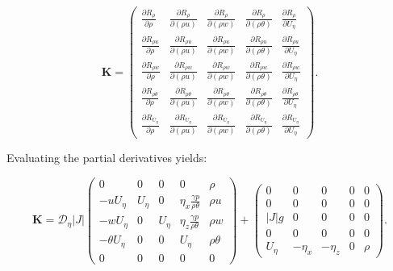 \documentclass[11pt,a4paper]{article}
\begin{document}
		\begin{equation}
			\mathbf{K} = \begin{pmatrix}
				\frac{\partial R_\rho}{\partial \rho} & \frac{\partial R_\rho}{\partial (\rho u)} & \frac{\partial R_\rho}{\partial (\rho w)} & \frac{\partial R_\rho}{\partial (\rho \theta)} & \frac{\partial R_\rho}{\partial U_\eta} \\[10pt]
				\frac{\partial R_{\rho u}}{\partial \rho} & \frac{\partial R_{\rho u}}{\partial (\rho u)} & \frac{\partial R_{\rho u}}{\partial (\rho w)} & \frac{\partial R_{\rho u}}{\partial (\rho \theta)} & \frac{\partial R_{\rho u}}{\partial U_\eta} \\[10pt]
				\frac{\partial R_{\rho w}}{\partial \rho} & \frac{\partial R_{\rho w}}{\partial (\rho u)} & \frac{\partial R_{\rho w}}{\partial (\rho w)} & \frac{\partial R_{\rho w}}{\partial (\rho \theta)} & \frac{\partial R_{\rho w}}{\partial U_\eta} \\[10pt]
				\frac{\partial R_{\rho \theta}}{\partial \rho} & \frac{\partial R_{\rho \theta}}{\partial (\rho u)} & \frac{\partial R_{\rho \theta}}{\partial (\rho w)} & \frac{\partial R_{\rho \theta}}{\partial (\rho \theta)} & \frac{\partial R_{\rho \theta}}{\partial U_\eta} \\[10pt]
				\frac{\partial R_{U_\eta}}{\partial \rho} & \frac{\partial R_{U_\eta}}{\partial (\rho u)} & \frac{\partial R_{U_\eta}}{\partial (\rho w)} & \frac{\partial R_{U_\eta}}{\partial (\rho \theta)} & \frac{\partial R_{U_\eta}}{\partial U_\eta}
			\end{pmatrix}.
		\end{equation}
		
		Evaluating the partial derivatives yields:
		
		\begin{equation}
			\mathbf{K} = \mathcal{D}_\eta |J| \begin{pmatrix}
				0 & 0 & 0 & 0 & \rho \\[8pt]
				-u U_\eta & U_\eta & 0 & \eta_x \frac{\gamma p}{\rho\theta} & \rho u \\[8pt]
				-w U_\eta & 0 & U_\eta & \eta_z \frac{\gamma p}{\rho\theta} & \rho w \\[8pt]
				-\theta U_\eta & 0 & 0 & U_\eta & \rho \theta \\[8pt]
				0 & 0 & 0 & 0 & 0
			\end{pmatrix}
			+ \begin{pmatrix}
				0 & 0 & 0 & 0 & 0 \\[6pt]
				0 & 0 & 0 & 0 & 0 \\[6pt]
				|J| g & 0 & 0 & 0 & 0 \\[6pt]
				0 & 0 & 0 & 0 & 0 \\[6pt]
				U_\eta & -\eta_x & -\eta_z & 0 & \rho
			\end{pmatrix}.
		\end{equation}
		
\end{document}
